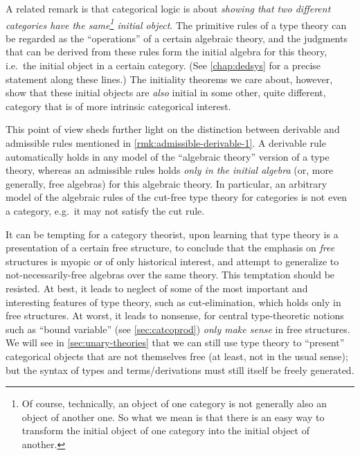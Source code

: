 \documentclass{book}
\begin{document}
\label{sec:identifying-initial-objects}
A related remark is that categorical logic is about \emph{showing that two different categories have the same\footnote{Of course, technically, an object of one category is not generally also an object of another one.  So what we mean is that there is an easy way to transform the initial object of one category into the initial object of another.} initial object}.
The primitive rules of a type theory can be regarded as the ``operations'' of a certain algebraic theory, and the judgments that can be derived from these rules form the initial algebra for this theory, i.e.\ the initial object in a certain category.
(See \cref{chap:dedsys} for a precise statement along these lines.)
The initiality theorems we care about, however, show that these initial objects are \emph{also} initial in some other, quite different, category that is of more intrinsic categorical interest.

\begin{rmk}\label{rmk:admissible-derivable-2}\label{rmk:free}
  This point of view sheds further light on the distinction between derivable and admissible rules mentioned in \cref{rmk:admissible-derivable-1}.
  A derivable rule automatically holds in any model of the ``algebraic theory'' version of a type theory, whereas an admissible rules holds \emph{only in the initial algebra} (or, more generally, free algebras) for this algebraic theory.
  In particular, an arbitrary model of the algebraic rules of the cut-free type theory for categories is not even a category, e.g.\ it may not satisfy the cut rule.

  It can be tempting for a category theorist, upon learning that type theory is a presentation of a certain free structure, to conclude that the emphasis on \emph{free} structures is myopic or of only historical interest, and attempt to generalize to not-necessarily-free algebras over the same theory.
  This temptation should be resisted.
  At best, it leads to neglect of some of the most important and interesting features of type theory, such as cut-elimination, which holds only in free structures.
  At worst, it leads to nonsense, for central type-theoretic notions such as ``bound variable'' (see \cref{sec:catcoprod}) \emph{only make sense} in free structures.
  We will see in \cref{sec:unary-theories} that we can still use type theory to ``present'' categorical objects that are not themselves free (at least, not in the usual sense); but the syntax of types and terms/derivations must still itself be freely generated.
\end{rmk}
\end{document}

